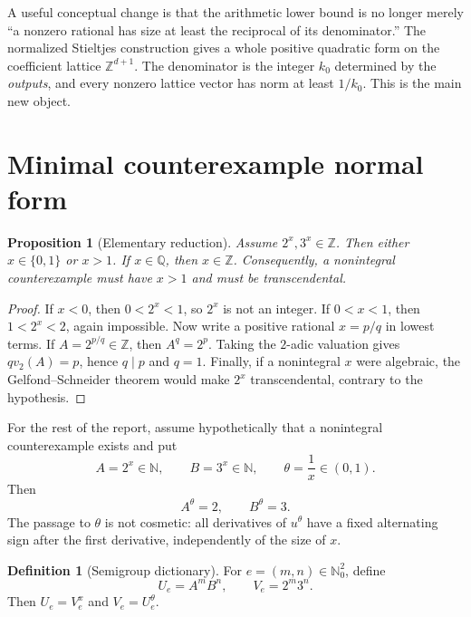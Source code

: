 \documentclass[11pt]{article}
\newtheorem{proposition}[theorem]{Proposition}
\theoremstyle{definition}
\newtheorem{definition}[theorem]{Definition}
\theoremstyle{remark}
\newcommand{\N}{\mathbb N}
\newcommand{\Z}{\mathbb Z}
\newcommand{\Q}{\mathbb Q}
\begin{document}
A useful conceptual change is that the arithmetic lower bound is no longer merely
``a nonzero rational has size at least the reciprocal of its denominator.''  The normalized
Stieltjes construction gives a whole positive quadratic form on the coefficient lattice
$\Z^{d+1}$.  The denominator is the integer $k_0$ determined by the \emph{outputs}, and every
nonzero lattice vector has norm at least $1/k_0$.  This is the main new object.

\section{Minimal counterexample normal form}

\begin{proposition}[Elementary reduction]\label{prop:normal}
Assume $2^x,3^x\in\Z$.  Then either $x\in\{0,1\}$ or $x>1$.  If $x\in\Q$, then $x\in\Z$.
Consequently, a nonintegral counterexample must have $x>1$ and must be transcendental.
\end{proposition}

\begin{proof}
If $x<0$, then $0<2^x<1$, so $2^x$ is not an integer.  If $0<x<1$, then
$1<2^x<2$, again impossible.  Now write a positive rational $x=p/q$ in lowest terms.
If $A=2^{p/q}\in\Z$, then $A^q=2^p$.  Taking the $2$-adic valuation gives
$qv_2(A)=p$, hence $q\mid p$ and $q=1$.  Finally, if a nonintegral $x$ were algebraic,
the Gelfond--Schneider theorem would make $2^x$ transcendental, contrary to the hypothesis.
\end{proof}

For the rest of the report, assume hypothetically that a nonintegral counterexample exists
and put
\begin{equation}\label{eq:ABtheta}
 A=2^x\in\N,\qquad B=3^x\in\N,\qquad \theta=\frac1x\in(0,1).
\end{equation}
Then
\begin{equation}\label{eq:reciprocal}
 A^\theta=2,\qquad B^\theta=3.
\end{equation}
The passage to $\theta$ is not cosmetic: all derivatives of $u^\theta$ have a fixed
alternating sign after the first derivative, independently of the size of $x$.

\begin{definition}[Semigroup dictionary]\label{def:dict}
For $e=(m,n)\in\N_0^2$, define
\[
 U_e=A^mB^n,\qquad V_e=2^m3^n.
\]
Then $U_e=V_e^x$ and $V_e=U_e^\theta$.
\end{definition}
\end{document}

